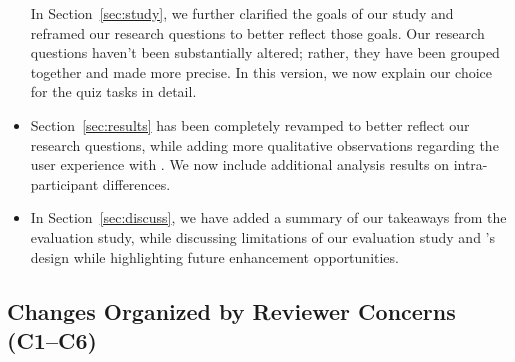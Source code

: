 \begin{itemize}
In Section~\ref{sec:study}, 
we further clarified the goals of our study
and reframed our research questions to 
better reflect those goals. 
Our research questions haven't been substantially altered;
rather, they have been grouped together and made more precise. 
In this version,
we now explain our choice
for the quiz tasks in detail. 
\item Section~\ref{sec:results} has been completely
revamped to better reflect our research questions,
while adding more qualitative observations 
regarding the user experience with \noah. 
We now
include additional analysis results on intra-participant differences. 
\item In Section~\ref{sec:discuss}, we have added a summary of our takeaways from the evaluation study, while discussing limitations of our evaluation study and \noah's design while highlighting future enhancement opportunities. 
\end{itemize}
\subsection*{Changes Organized by Reviewer Concerns (C1--C6)}


